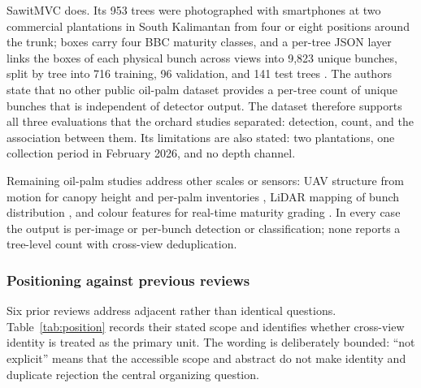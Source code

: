 SawitMVC does. Its 953 trees were photographed with smartphones at two commercial plantations in South Kalimantan from four or eight positions around the trunk; boxes carry four BBC maturity classes, and a per-tree JSON layer links the boxes of each physical bunch across views into 9{,}823 unique bunches, split by tree into 716 training, 96 validation, and 141 test trees \cite{indriani2026sawitmvc}. The authors state that no other public oil-palm dataset provides a per-tree count of unique bunches that is independent of detector output. The dataset therefore supports all three evaluations that the orchard studies separated: detection, count, and the association between them. Its limitations are also stated: two plantations, one collection period in February 2026, and no depth channel.

Remaining oil-palm studies address other scales or sensors: UAV structure from motion for canopy height and per-palm inventories \cite{ledger_m_084cfd5badbb63d3}, LiDAR mapping of bunch distribution \cite{ledger_r_3e45c6dc2566f46b}, and colour features for real-time maturity grading \cite{ledger_r_2f7d604b1d3fa5e4}. In every case the output is per-image or per-bunch detection or classification; none reports a tree-level count with cross-view deduplication.





\subsubsection{Positioning against previous reviews}

Six prior reviews address adjacent rather than identical questions. Table~\ref{tab:position} records their stated scope and identifies whether cross-view identity is treated as the primary unit. The wording is deliberately bounded: ``not explicit'' means that the accessible scope and abstract do not make identity and duplicate rejection the central organizing question.

